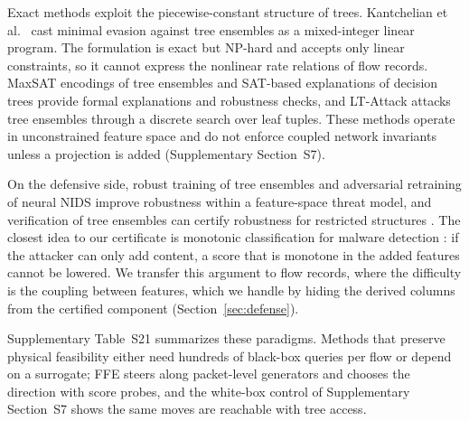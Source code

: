 Exact methods exploit the piecewise-constant structure of trees. Kantchelian et al.~\cite{kantchelian2016evasion} cast minimal evasion against tree ensembles as a mixed-integer linear program. The formulation is exact but NP-hard and accepts only linear constraints, so it cannot express the nonlinear rate relations of flow records. MaxSAT encodings of tree ensembles \cite{ignatiev2022formal} and SAT-based explanations of decision trees \cite{izza2022tackling} provide formal explanations and robustness checks, and LT-Attack \cite{zhang2020efficient} attacks tree ensembles through a discrete search over leaf tuples. These methods operate in unconstrained feature space and do not enforce coupled network invariants unless a projection is added (Supplementary Section~S7).

On the defensive side, robust training of tree ensembles \cite{chen2019robust, andriushchenko2019provably, calzavara2020treant, vos2021efficient} and adversarial retraining of neural NIDS \cite{hashemi2020enhancing} improve robustness within a feature-space threat model, and verification of tree ensembles can certify robustness for restricted structures \cite{calzavara2023verifiable, calzavara2025verifiableboosted}. The closest idea to our certificate is monotonic classification for malware detection \cite{incer2018adversarially}: if the attacker can only add content, a score that is monotone in the added features cannot be lowered. We transfer this argument to flow records, where the difficulty is the coupling between features, which we handle by hiding the derived columns from the certified component (Section~\ref{sec:defense}).

Supplementary Table~S21 summarizes these paradigms. Methods that preserve physical feasibility either need hundreds of black-box queries per flow or depend on a surrogate; FFE steers along packet-level generators and chooses the direction with score probes, and the white-box control of Supplementary Section~S7 shows the same moves are reachable with tree access.
